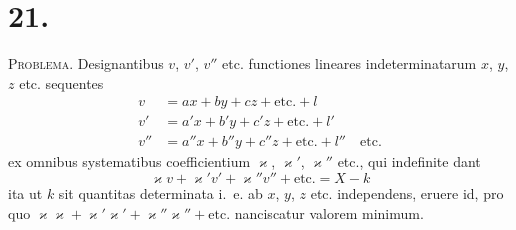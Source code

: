 \documentclass[12pt,a4paper]{book}
\begin{document}
\section*{21.}
\label{sec:art21}

\textsc{Problema.} Designantibus $v$, $v'$, $v''$ etc. functiones lineares indeterminatarum $x$, $y$, $z$ etc. sequentes
%
\begin{equation*}
\begin{aligned}
v &= ax+by+cz+\text{etc.}+l\\
v' &= a'x+b'y+c'z+\text{etc.}+l'\\
v'' &= a''x+b''y+c''z+\text{etc.}+l''\quad\text{etc.}
\end{aligned}\tag{I}
\end{equation*}
ex omnibus systematibus coefficientium $\varkappa$, $\varkappa'$, $\varkappa''$ etc., qui indefinite dant
%
\begin{equation*}
\varkappa v+\varkappa'v'+\varkappa''v''+\text{etc.}=X-k
\end{equation*}
ita ut $k$ sit quantitas determinata i.~e. ab $x$, $y$, $z$ etc. independens, eruere id, pro quo $\varkappa\varkappa+\varkappa'\varkappa'+\varkappa''\varkappa''+\text{etc.}$ nanciscatur valorem minimum.
\end{document}
